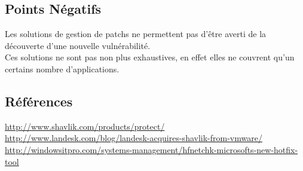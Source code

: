 \subsection{Points Négatifs}
Les solutions de gestion de patchs ne permettent pas d’être averti de la découverte d’une nouvelle vulnérabilité.\\

Ces solutions ne sont pas non plus exhaustives, en effet elles ne couvrent qu'un certains nombre d’applications.\\

\subsection{Références}
\small
\noindent
\url{http://www.shavlik.com/products/protect/}\newline
\url{http://www.landesk.com/blog/landesk-acquires-shavlik-from-vmware/}\newline
\url{http://windowsitpro.com/systems-management/hfnetchk-microsofts-new-hotfix-tool}\newline
\normalsize